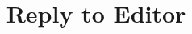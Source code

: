 \documentclass[preprint,3p,times]{elsarticle}
\begin{document}
\begin{frontmatter}
    \title{Reply to Editor}
\end{frontmatter}










\end{document}

